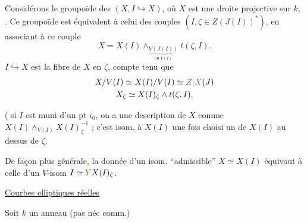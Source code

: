 Considérons le groupoïde des $(X,I\hookrightarrow X)$, où $X$ est
une droite projective sur $k$, .
Ce groupoïde est équivalent à celui des couples $(I,\zeta\in Z(J(I))^*)$,
en associant à ce couple
\[
X=X(I)\wedge_{\underbrace{V(J(I))}_{\text{ou }V(I)}}t(\zeta,I).
\]
$I\hookrightarrow X$ est la fibre  de $X$ en $\zeta$, compte tenu que
\[
\begin{gathered}
X/V(I)\simeq X(I)/V(I)\simeq\unsure{Z|X}(J)\\
X_\zeta\simeq X(I)_\zeta\wedge t(\zeta,I).
\end{gathered}
\]

( si $I$ est muni d'un pt $i_0$, on a une description
de $X$ comme $X(I)\wedge_{V(I)}X(I)_\zeta^{-1}$ ; c'est isom. à $X(I)$ une
fois choisi un  de $X(I)$ au dessus de $\zeta$.

De façon plus générale,  la donnée d'un
isom. ``admissible'' $X\simeq X(I)$ équivaut à celle d'un
$V$-isom $I\simeq\deleted{\unsure{Y}}X(I)_\zeta$.

\uline{Courbes elliptiques réelles}

Soit $k$ un anneau (pas néc comm.)


